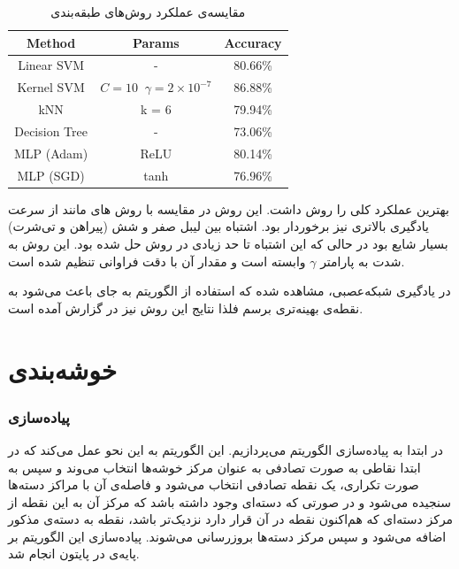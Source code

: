 \documentclass[a4paper]{article}
\begin{document}
\begin{large}
\begin{center}
\begin{table}[h!]
\begin{latin}
\begin{tabular}{|c|c|c|}
				\hline
				\rowcolor[HTML]{C0C0C0} 
		Method        & Params                                                                                             & Accuracy \\
				\hline
		Linear SVM    & -                                                                                                  & 80.66\%  \\
		
		\hline
		Kernel SVM    &$ C= 10\;\;\gamma = 2\times 10^{-7}$ & 86.88\%  \\				\hline
		kNN           & k = 6                                                                                              & 79.94\%  \\
				\hline
		Decision Tree & -                                                                                                  & 73.06\%  \\
				\hline
		MLP (Adam)    & ReLU                                                                                               & 80.14\%  \\
				\hline
		MLP (SGD)     & tanh                                                                                               & 76.96\% \\
				\hline
	\end{tabular}
\end{latin}
\caption{مقایسه‌ی عملکرد روش‌های طبقه‌بندی }
\end{table}
\end{center}

بهترین عملکرد کلی را روش 
داشت. این روش در مقایسه با روش ‌های مانند 
از سرعت یادگیری بالاتری نیز برخوردار بود. اشتباه بین لیبل صفر و شش (پیراهن و تی‌شرت) بسیار شایع بود در حالی که این اشتباه تا حد زیادی در روش 
حل شده بود.  این روش به شدت به پارامتر
$\gamma$
وابسته است و مقدار آن با دقت فراوانی تنظیم شده است.


در یادگیری شبکه‌‌عصبی، مشاهده شده که استفاده از الگوریتم 
به جای 
باعث می‌شود به نقطه‌ی بهینه‌تری برسم فلذا نتایج این روش نیز در گزارش آمده است.
\part{خوشه‌بندی}
\section{پیاده‌سازی 
}

در ابتدا به پیاده‌سازی الگوریتم 
می‌پردازیم. این الگوریتم به این نحو عمل می‌کند که در ابتدا نقاطی به صورت تصادفی به عنوان مرکز خوشه‌ها انتخاب می‌وند و سپس به صورت تکراری، یک نقطه تصادفی انتخاب می‌شود و فاصله‌ی آن با مراکز دسته‌ها سنجیده می‌شود و در صورتی که دسته‌ای وجود داشته باشد که مرکز آن به این نقطه از مرکز دسته‌ای که هم‌اکنون نقطه در آن قرار دارد نزدیک‌تر باشد، نقطه به دسته‌ی مذکور اضافه می‌شود و سپس مرکز دسته‌ها بروزرسانی می‌شوند. پیاده‌سازی این الگوریتم بر پایه‌ی 
در پایتون انجام شد.



\end{large}
\end{document}
